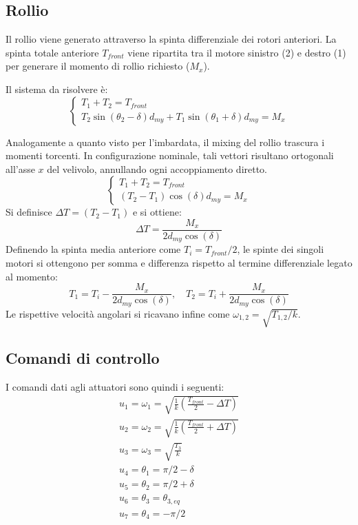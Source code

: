 \subsection{Rollio}
Il rollio viene generato attraverso la spinta differenziale dei rotori anteriori. La spinta totale anteriore $T_{front}$ viene ripartita tra il motore sinistro (2) e destro (1) per generare il momento di rollio richiesto ($M_x$).

Il sistema da risolvere è:
\begin{equation}
    \begin{cases}
    T_1 + T_2 = T_{front} \\
    T_2 \sin(\theta_2 - \delta) d_{my} + T_1 \sin(\theta_1 + \delta) d_{my} = M_x
    \end{cases}
\end{equation}

Analogamente a quanto visto per l'imbardata, il mixing del rollio trascura i momenti torcenti. 
In configurazione nominale, tali vettori risultano ortogonali all'asse $x$ del velivolo, 
annullando ogni accoppiamento diretto.
\begin{equation}
    \begin{cases}
    T_1 + T_2 = T_{front} \\
    (T_2 - T_1) \cos(\delta) d_{my} = M_x
    \end{cases}
\end{equation}
Si definisce $\Delta T = (T_2 - T_1)$ e si ottiene:
\begin{equation}
    \Delta T = \frac{M_x}{2 d_{my} \cos(\delta)}
\end{equation}
Definendo la spinta media anteriore come $T_i = T_{front} / 2$, le spinte dei singoli motori si ottengono per somma e differenza rispetto al termine differenziale legato al momento:
\begin{equation}
    T_1 = T_i - \frac{M_x}{2 d_{my} \cos(\delta)}, \quad T_2 = T_i + \frac{M_x}{2 d_{my} \cos(\delta)}
\end{equation}
Le rispettive velocità angolari si ricavano infine come $\omega_{1,2} = \sqrt{T_{1,2}/k}$.

\subsection{Comandi di controllo}
I comandi dati agli attuatori sono quindi i seguenti:
\begin{gather}
    u_1 = \omega_1 = \sqrt{\frac{1}{k} \left(\frac{T_{front}}{2} - \Delta T \right)}\\
    u_2 = \omega_2 = \sqrt{\frac{1}{k} \left(\frac{T_{front}}{2} + \Delta T \right)}\\
    u_3 = \omega_3 = \sqrt{\frac{T_3}{k}}\\
    u_4 = \theta_1 = \pi/2 - \delta\\
    u_5 = \theta_2 = \pi/2 + \delta\\
    u_6 = \theta_3 = \theta_{3,eq}\\
    u_7 = \theta_4 = -\pi/2
\end{gather}


